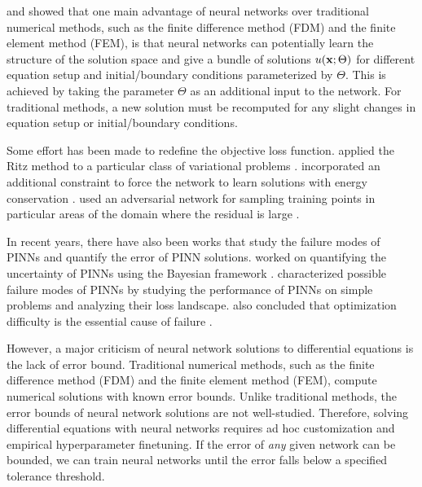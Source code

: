    \citeauthor{flamant2020solving} and \citeauthor{DesaiShaan2021OTLo} showed that one main advantage of neural networks over traditional numerical methods, such as the finite difference method (FDM) and the finite element method (FEM), is that neural networks can potentially learn the structure of the solution space and give a bundle of solutions $u(\mathbf{x}; \Theta)$ for different equation setup and initial/boundary conditions parameterized by $\Theta$.
    This is achieved by taking the parameter $\Theta$ as an additional input to the network.
    For traditional methods, a new solution must be recomputed for any slight changes in equation setup or initial/boundary conditions.

    Some effort has been made to redefine the objective loss function. 
    \citeauthor{yu2017deep} applied the Ritz method to a particular class of variational problems \cite{yu2017deep}.
    \citeauthor{mattheakis2020hamiltonian} incorporated an additional constraint to force the network to learn solutions with energy conservation \cite{mattheakis2020hamiltonian}.
    \citeauthor{parwani2021adversarial} used an adversarial network for sampling training points in particular areas of the domain where the residual is large \cite{parwani2021adversarial}.

    In recent years, there have also been works that study the failure modes of PINNs and quantify the error of PINN solutions. 
    \citeauthor{graf2021uncertainty} worked on quantifying the uncertainty of PINNs using the Bayesian framework \cite{graf2021uncertainty}.
    \citeauthor{krishnapriyan2021characterizing} characterized possible failure modes of PINNs by studying the performance of PINNs on simple problems and analyzing their loss landscape\cite{krishnapriyan2021characterizing}. 
    \citeauthor{krishnapriyan2021characterizing} also concluded that optimization difficulty is the essential cause of failure \cite{krishnapriyan2021characterizing}.

However, a major criticism of neural network solutions to differential equations is the lack of error bound. 
Traditional numerical methods, such as the finite difference method (FDM) and the finite element method (FEM), compute numerical solutions with known error bounds.
Unlike traditional methods, the error bounds of neural network solutions are not well-studied.
Therefore, solving differential equations with neural networks requires ad hoc customization and empirical hyperparameter finetuning.
If the error of \textit{any} given network can be bounded, we can train neural networks until the error falls below a specified tolerance threshold.

